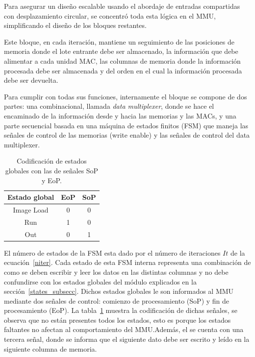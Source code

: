 Para asegurar un diseño escalable usando el abordaje de entradas compartidas con
desplazamiento circular, se concentró toda esta lógica en el MMU, simplificando
el diseño de los bloques restantes.

Este bloque, en cada iteración, mantiene un seguimiento de las posiciones de
memoria donde el lote entrante debe ser almacenado, la información que debe
alimentar a cada unidad MAC, las columnas de memoria donde la información
procesada debe ser almacenada y del orden en el cual la información procesada
debe ser devuelta.

Para cumplir con todas sus funciones, internamente el bloque se
compone de dos partes: una combinacional, llamada \textit{data multiplexer}, donde se
hace el encaminado de la información desde y hacia las memorias y las MACs, y
una parte secuencial basada en una máquina de estados finitos (FSM) que maneja
las señales de control de las memorias (write enable) y las señales de control
del data multiplexer.

\begin{table}
\renewcommand{\arraystretch}{1.3}
\caption{Codificación de estados globales con las de señales SoP y EoP.}\label{MMU:glob_states}
\centering
\begin{tabular}{|c|c|c|}
  \hline
  \textbf{Estado global} & \textbf{EoP} & \textbf{SoP}\\\hline
  Image Load             & 0            & 0           \\\hline
  Run                    & 1            & 0           \\\hline
  Out                    & 0            & 1           \\\hline
\end{tabular}           
\end{table}

El número de estados de la FSM esta dado por el número de iteraciones $It$ de la
ecuación~\ref{niter}. Cada estado de esta FSM interna representa una combinación de como se deben
escribir y leer los datos en las distintas columnas y no debe confundirse con
los estados globales del módulo explicados en la sección~\ref{states_subsecc}. Dichos
estados globales le son informados al MMU mediante dos señales de control:
comienzo de procesamiento (SoP) y fin de procesamiento (EoP). La
tabla~\ref{MMU:glob_states} muestra la codificación de dichas señales, se
observa que no están presentes todos los estados, esto es porque los estados
faltantes no afectan al comportamiento del MMU.\@ Además, el se cuenta con una
tercera señal, donde se informa que el siguiente dato debe ser escrito y leído
en la siguiente columna de memoria. 

